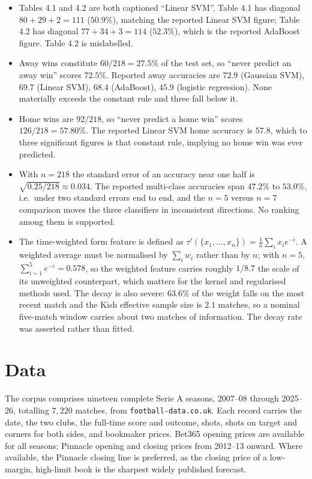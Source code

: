 \documentclass[11pt]{article}
\begin{document}
\begin{itemize}
\item Tables 4.1 and 4.2 are both captioned ``Linear SVM''. Table 4.1 has
diagonal $80+29+2=111$ ($50.9\%$), matching the reported Linear SVM figure;
Table 4.2 has diagonal $77+34+3=114$ ($52.3\%$), which is the reported AdaBoost
figure. Table 4.2 is mislabelled.

\item Away wins constitute $60/218 = 27.5\%$ of the test set, so ``never
predict an away win'' scores $72.5\%$. Reported away accuracies are $72.9$
(Gaussian SVM), $69.7$ (Linear SVM), $68.4$ (AdaBoost), $45.9$ (logistic
regression). None materially exceeds the constant rule and three fall below it.

\item Home wins are $92/218$, so ``never predict a home win'' scores
$126/218 = 57.80\%$. The reported Linear SVM home accuracy is $57.8$, which to
three significant figures is that constant rule, implying no home win was ever
predicted.

\item With $n=218$ the standard error of an accuracy near one half is
$\sqrt{0.25/218} \approx 0.034$. The reported multi-class accuracies span
$47.2\%$ to $53.0\%$, i.e.\ under two standard errors end to end, and the
$n=5$ versus $n=7$ comparison moves the three classifiers in inconsistent
directions. No ranking among them is supported.

\item The time-weighted form feature is defined as $\tau'(\{x_1,\dots,x_n\}) =
\frac{1}{n}\sum_i x_i e^{-i}$. A weighted average must be normalised by
$\sum_i w_i$ rather than by $n$; with $n=5$, $\sum_{i=1}^5 e^{-i} = 0.578$, so
the weighted feature carries roughly $1/8.7$ the scale of its unweighted
counterpart, which matters for the kernel and regularised methods used. The
decay is also severe: $63.6\%$ of the weight falls on the most recent match and
the Kish effective sample size \citep{kish1965} is $2.1$ matches, so a nominal
five-match window carries about two matches of information. The decay rate was
asserted rather than fitted.
\end{itemize}

\section{Data}
\label{sec:data}

The corpus comprises nineteen complete Serie A seasons, 2007--08 through
2025--26, totalling $7{,}220$ matches, from \texttt{football-data.co.uk}. Each
record carries the date, the two clubs, the full-time score and outcome, shots,
shots on target and corners for both sides, and bookmaker prices. Bet365
opening prices are available for all seasons; Pinnacle opening and closing
prices from 2012--13 onward. Where available, the Pinnacle closing line is
preferred, as the closing price of a low-margin, high-limit book is the sharpest
widely published forecast.
\end{document}
